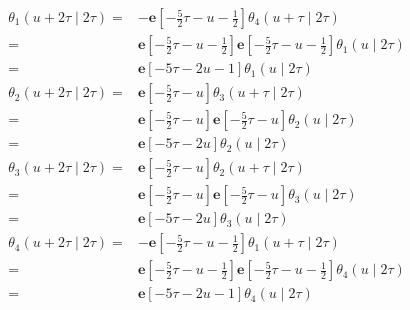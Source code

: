 \documentclass[12pt,b5paper]{ltjsarticle}
\begin{document}
\begin{enumerate}
\begin{enumerate}
             \begin{align}
              \theta_{1} (u + 2\tau \mid 2\tau)
              =& -\mathbf{e}[-\frac{5}{2}\tau-u-\frac{1}{2}]
              \theta_{4} (u+\tau \mid 2\tau )\\
              =& \mathbf{e}[-\frac{5}{2}\tau-u-\frac{1}{2}]
              \mathbf{e}[-\frac{5}{2}\tau-u-\frac{1}{2}]
              \theta_{1} (u \mid 2\tau )\\
              =& \mathbf{e}[-5\tau-2u-1]\theta_{1} (u \mid 2\tau )\\
              \theta_{2} (u + 2\tau \mid 2\tau)
              =& \mathbf{e}[-\frac{5}{2}\tau-u]
              \theta_{3} (u+\tau \mid 2\tau )\\
              =& \mathbf{e}[-\frac{5}{2}\tau-u]
              \mathbf{e}[-\frac{5}{2}\tau-u]
              \theta_{2} (u \mid 2\tau )\\
              =& \mathbf{e}[-5\tau-2u]
              \theta_{2} (u \mid 2\tau )\\
              \theta_{3} (u + 2\tau \mid 2\tau)
              =& \mathbf{e}[-\frac{5}{2}\tau-u]
              \theta_{2} (u+\tau \mid 2\tau )\\
              =& \mathbf{e}[-\frac{5}{2}\tau-u]
              \mathbf{e}[-\frac{5}{2}\tau-u]
              \theta_{3} (u \mid 2\tau )\\
              =& \mathbf{e}[-5\tau-2u]
              \theta_{3} (u \mid 2\tau )\\
              \theta_{4} (u + 2\tau \mid 2\tau)
              =& -\mathbf{e}[-\frac{5}{2}\tau-u-\frac{1}{2}]
              \theta_{1} (u+\tau \mid 2\tau )\\
              =& \mathbf{e}[-\frac{5}{2}\tau-u-\frac{1}{2}]
              \mathbf{e}[-\frac{5}{2}\tau-u-\frac{1}{2}]
              \theta_{4} (u \mid 2\tau )\\
              =& \mathbf{e}[-5\tau-2u-1]\theta_{4} (u \mid 2\tau)
             \end{align}




             \hrulefill

       \end{enumerate}

\end{enumerate}

\hrulefill
\end{document}
